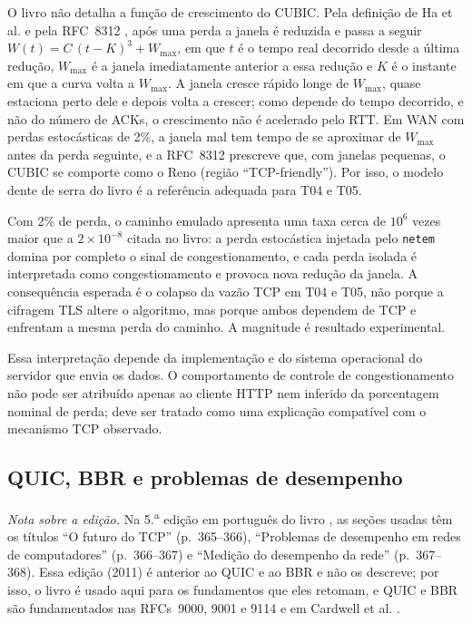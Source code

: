 \documentclass[12pt,a4paper]{article}
\begin{document}
O livro não detalha a função de crescimento do CUBIC. Pela definição de Ha et al.
\cite{ha2008} e pela RFC~8312 \cite{rfc8312}, após uma perda a janela é reduzida e passa a
seguir $W(t)=C\,(t-K)^3+W_{\max}$, em que $t$ é o tempo real decorrido desde a última
redução, $W_{\max}$ é a janela imediatamente anterior a essa redução e $K$ é o instante em
que a curva volta a $W_{\max}$. A janela cresce rápido longe de $W_{\max}$, quase estaciona
perto dele e depois volta a crescer; como depende do tempo decorrido, e não do número de ACKs,
o crescimento não é acelerado pelo RTT. Em WAN com perdas estocásticas de 2\%, a janela mal
tem tempo de se aproximar de $W_{\max}$ antes da perda seguinte, e a RFC~8312 prescreve que,
com janelas pequenas, o CUBIC se comporte como o Reno (região ``TCP-friendly''). Por isso, o
modelo dente de serra do livro é a referência adequada para T04 e T05.

Com 2\% de perda, o caminho emulado apresenta uma taxa cerca de $10^{6}$ vezes maior que a
$2\times10^{-8}$ citada no livro: a perda estocástica injetada pelo \texttt{netem} domina por
completo o sinal de congestionamento, e cada perda isolada é interpretada como
congestionamento e provoca nova redução da janela. A consequência esperada é o colapso da
vazão TCP em T04 e T05, não porque a cifragem TLS altere o algoritmo, mas porque ambos
dependem de TCP e enfrentam a mesma perda do caminho. A magnitude é resultado experimental.

Essa interpretação depende da implementação e do sistema operacional do servidor que envia
os dados. O comportamento de controle de congestionamento não pode ser atribuído apenas ao
cliente HTTP nem inferido da porcentagem nominal de perda; deve ser tratado como uma
explicação compatível com o mecanismo TCP observado.

\subsection{QUIC, BBR e problemas de desempenho}

\emph{Nota sobre a edição.} Na 5.\textsuperscript{a} edição em português do livro \cite{tanenbaum}, as
seções usadas têm os títulos ``O futuro do TCP'' (p.~365--366),
``Problemas de desempenho em redes de computadores'' (p.~366--367) e ``Medição do
desempenho da rede'' (p.~367--368). Essa edição (2011) é anterior ao QUIC e ao BBR e
não os descreve; por isso, o livro é usado aqui para os fundamentos que eles retomam, e QUIC e
BBR são fundamentados nas RFCs~9000, 9001 e 9114 e em Cardwell et al. \cite{bbr2016}.
\end{document}
